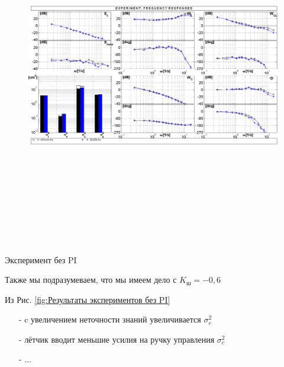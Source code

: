 \begin{figure}[H]
    \centering \includegraphics[width=17cm,height=15cm]{Оглавление/Part3/figures/chast2_20A30B.png}
    \caption{}
    \label{fig:Частотки второй Системы с изменением А и В}
    \end{figure}

    \begin{center}
        Эксперимент без PI 
    \end{center}



    Также мы подразумеваем, что мы имеем дело с $K_\text{ш} = -0,6$

    Из Рис. \ref{fig:Результаты экспериментов без PI}
    \begin{itemize}
        \item [-] c увеличением неточности знаний увеличивается $\sigma_e^2$
        \item [-] лётчик вводит меньшие усилия на ручку управления $\sigma^2_c$ 
        \item [-]  ...  
    \end{itemize}